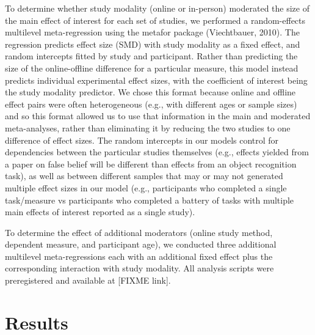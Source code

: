 \documentclass[
  man,floatsintext]{apa6}
\begin{document}
To determine whether study modality (online or in-person) moderated the size of the main effect of interest for each set of studies, we performed a random-effects multilevel meta-regression using the metafor package (Viechtbauer, 2010). The regression predicts effect size (SMD) with study modality as a fixed effect, and random intercepts fitted by study and participant. Rather than predicting the size of the online-offline difference for a particular measure, this model instead predicts individual experimental effect sizes, with the coefficient of interest being the study modality predictor. We chose this format because online and offline effect pairs were often heterogeneous (e.g., with different ages or sample sizes) and so this format allowed us to use that information in the main and moderated meta-analyses, rather than eliminating it by reducing the two studies to one difference of effect sizes. The random intercepts in our models control for dependencies between the particular studies themselves (e.g., effects yielded from a paper on false belief will be different than effects from an object recognition task), as well as between different samples that may or may not generated multiple effect sizes in our model (e.g., participants who completed a single task/measure vs participants who completed a battery of tasks with multiple main effects of interest reported as a single study).

To determine the effect of additional moderators (online study method, dependent measure, and participant age), we conducted three additional multilevel meta-regressions each with an additional fixed effect plus the corresponding interaction with study modality. All analysis scripts were preregistered and available at {[}FIXME link{]}.

\hypertarget{results}{%
\section{Results}\label{results}}
\end{document}
